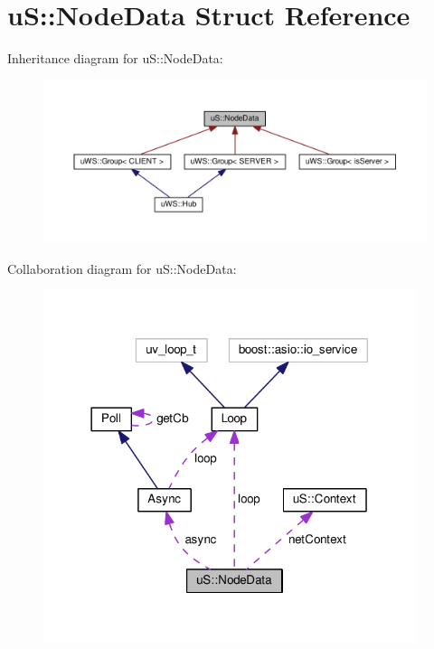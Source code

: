 \hypertarget{structu_s_1_1_node_data}{}\section{uS\+:\+:Node\+Data Struct Reference}
\label{structu_s_1_1_node_data}


Inheritance diagram for uS\+:\+:Node\+Data\+:
\nopagebreak
\begin{figure}[H]
\begin{center}
\leavevmode
\includegraphics[width=350pt]{structu_s_1_1_node_data__inherit__graph}
\end{center}
\end{figure}


Collaboration diagram for uS\+:\+:Node\+Data\+:
\nopagebreak
\begin{figure}[H]
\begin{center}
\leavevmode
\includegraphics[width=309pt]{structu_s_1_1_node_data__coll__graph}
\end{center}
\end{figure}
